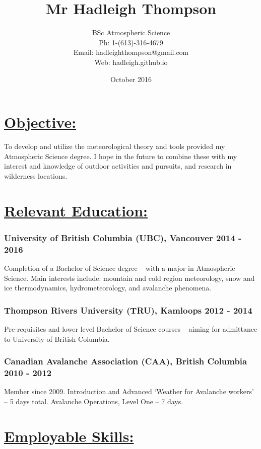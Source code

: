 \documentclass[]{article}
\title{Mr Hadleigh Thompson}
\author{BSc Atmospheric Science\\ 
Ph: 1-(613)-316-4679 \\
Email: hadleighthompson@gmail.com \\
Web: hadleigh.github.io}
\date{October 2016}
\begin{document}
\maketitle
\vspace{10mm}

\section*{\underline{Objective:}}  
To develop and utilize the meteorological theory and tools provided my Atmospheric Science degree. I hope in the future to combine these with my interest and knowledge of outdoor activities and pursuits, and research in wilderness locations. 

\section*{\underline{Relevant Education:}}
\subsubsection*{University of British Columbia (UBC), Vancouver 2014 - 2016}
Completion of a Bachelor of Science degree – with a major in Atmospheric Science. Main
interests include: mountain and cold region meteorology, snow and ice thermodynamics,
hydrometeorology, and avalanche phenomena.
\subsubsection*{Thompson Rivers University (TRU), Kamloops 2012 - 2014}
Pre-requisites and lower level Bachelor of Science courses – aiming for admittance to University of British
Columbia.
\subsubsection*{Canadian Avalanche Association (CAA), British Columbia 2010 - 2012}
Member since 2009. Introduction and Advanced ‘Weather for Avalanche workers’ – 5 days total. Avalanche Operations, Level One – 7 days.

\section*{\underline{Employable Skills:}}
\end{document}
